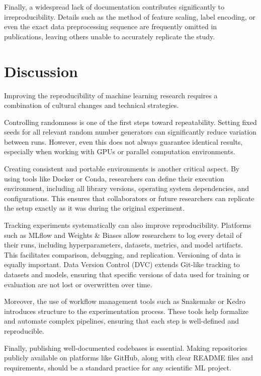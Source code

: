 \documentclass[11pt]{article}
\begin{document}
Finally, a widespread lack of documentation contributes significantly to irreproducibility. 
%
Details such as the method of feature scaling, label encoding, 
 or even the exact data preprocessing sequence are frequently omitted 
 in publications, leaving others unable to accurately replicate the study.


\section{Discussion}
\label{sec:system}
Improving the reproducibility of machine learning research requires a combination of 
 cultural changes and technical strategies.

Controlling randomness is one of the first steps toward repeatability. 
%
Setting fixed seeds for all relevant random number generators can significantly 
 reduce variation between runs. 
%
However, even this does not always guarantee identical results, especially when 
 working with GPUs or parallel computation environments.

Creating consistent and portable environments is another critical aspect. 
%
By using tools like Docker or Conda, researchers can define their execution environment, 
 including all library versions, operating system dependencies, and configurations. 
% 
This ensures that collaborators or future researchers can replicate the setup exactly as 
 it was during the original experiment.

Tracking experiments systematically can also improve reproducibility. 
%
Platforms such as MLflow and Weights \& Biases allow researchers to log 
 every detail of their runs, including hyperparameters, datasets, metrics, and model artifacts. 
%
This facilitates comparison, debugging, and replication.
%
Versioning of data is equally important. 
%
Data Version Control (DVC) extends Git-like tracking to datasets and models, 
 ensuring that specific versions of data used for training or evaluation 
 are not lost or overwritten over time.

Moreover, the use of workflow management tools such as Snakemake or Kedro introduces structure 
 to the experimentation process. 
%
These tools help formalize and automate complex pipelines, ensuring that each 
 step is well-defined and reproducible.

Finally, publishing well-documented codebases is essential. 
%
Making repositories publicly available on platforms like GitHub, 
 along with clear README files and requirements, 
 should be a standard practice for any scientific ML project.
\end{document}
